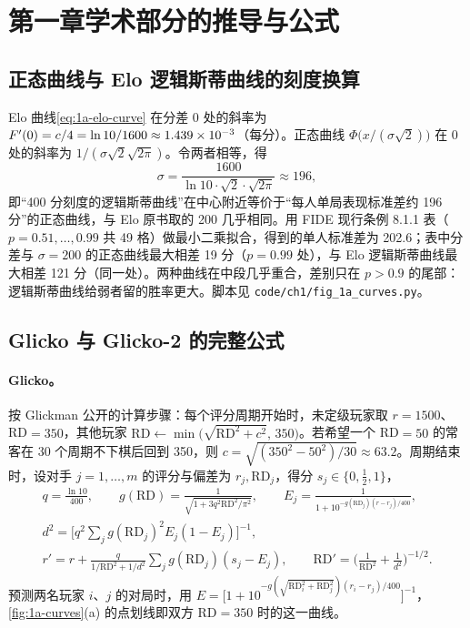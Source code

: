 \section{第一章学术部分的推导与公式}\label{app:ch1a}

\subsection{正态曲线与 Elo 逻辑斯蒂曲线的刻度换算}\label{app:ch1a-scale}

Elo 曲线\cref{eq:1a-elo-curve} 在分差 0 处的斜率为 $F'(0)=c/4=\ln 10/1600\approx 1.439\times10^{-3}$（每分）。正态曲线 $\Phi\big(x/(\sigma\sqrt2)\big)$ 在 0 处的斜率为 $1/(\sigma\sqrt2\sqrt{2\pi})$。令两者相等，得
\[
  \sigma=\frac{1600}{\ln 10\cdot\sqrt{2}\cdot\sqrt{2\pi}}\approx 196 ,
\]
即“400 分刻度的逻辑斯蒂曲线”在中心附近等价于“每人单局表现标准差约 196 分”的正态曲线，与 Elo 原书取的 200 几乎相同\tagOwn。用 FIDE 现行条例 8.1.1 表（$p=0.51,\dots,0.99$ 共 49 格）做最小二乘拟合，得到的单人标准差为 202.6；表中分差与 $\sigma=200$ 的正态曲线最大相差 19 分（$p=0.99$ 处），与 Elo 逻辑斯蒂曲线最大相差 121 分（同一处）\tagOwn。两种曲线在中段几乎重合，差别只在 $p>0.9$ 的尾部：逻辑斯蒂曲线给弱者留的胜率更大。脚本见 \texttt{code/ch1/fig\_1a\_curves.py}。

\subsection{Glicko 与 Glicko-2 的完整公式}\label{app:ch1a-glicko}

\paragraph{Glicko。}按 Glickman 公开的计算步骤\cite{glickman2016glicko}：每个评分周期开始时，未定级玩家取 $r=1500$、RD$=350$，其他玩家 $\mathrm{RD}\leftarrow\min\big(\sqrt{\mathrm{RD}^2+c^2},\,350\big)$。若希望一个 RD$=50$ 的常客在 30 个周期不下棋后回到 350，则 $c=\sqrt{(350^2-50^2)/30}\approx 63.2$。周期结束时，设对手 $j=1,\dots,m$ 的评分与偏差为 $r_j,\mathrm{RD}_j$，得分 $s_j\in\{0,\tfrac12,1\}$，
\begin{gather*}
  q=\frac{\ln 10}{400},\qquad g(\mathrm{RD})=\frac{1}{\sqrt{1+3q^2\mathrm{RD}^2/\pi^2}},\qquad
  E_j=\frac{1}{1+10^{-g(\mathrm{RD}_j)(r-r_j)/400}},\\
  d^2=\Big[q^2\sum_j g(\mathrm{RD}_j)^2E_j(1-E_j)\Big]^{-1},\\
  r' = r + \frac{q}{1/\mathrm{RD}^2+1/d^2}\sum_j g(\mathrm{RD}_j)(s_j-E_j),\qquad
  \mathrm{RD}'=\Big(\frac{1}{\mathrm{RD}^2}+\frac{1}{d^2}\Big)^{-1/2}.
\end{gather*}
预测两名玩家 $i$、$j$ 的对局时，用 $E=\big[1+10^{-g(\sqrt{\mathrm{RD}_i^2+\mathrm{RD}_j^2})(r_i-r_j)/400}\big]^{-1}$，\cref{fig:1a-curves}(a) 的点划线即双方 RD$=350$ 时的这一曲线。

